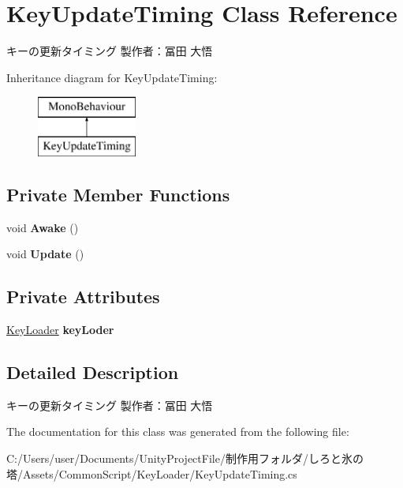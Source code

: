 \hypertarget{class_key_update_timing}{}\section{Key\+Update\+Timing Class Reference}
\label{class_key_update_timing}


キーの更新タイミング 製作者：冨田 大悟  


Inheritance diagram for Key\+Update\+Timing\+:\begin{figure}[H]
\begin{center}
\leavevmode
\includegraphics[height=2.000000cm]{class_key_update_timing}
\end{center}
\end{figure}
\subsection*{Private Member Functions}
\begin{DoxyCompactItemize}
\item 
\mbox{\label{class_key_update_timing_a2bd76d5f67f94cfebfd625121a2a562e}} 
void {\bfseries Awake} ()
\item 
\mbox{\label{class_key_update_timing_ac238dc3ea4a7f20b475e4168cf951e15}} 
void {\bfseries Update} ()
\end{DoxyCompactItemize}
\subsection*{Private Attributes}
\begin{DoxyCompactItemize}
\item 
\mbox{\label{class_key_update_timing_a670e725e80313518d1144a62f9f43487}} 
\hyperlink{class_key_loader}{Key\+Loader} {\bfseries key\+Loder}
\end{DoxyCompactItemize}


\subsection{Detailed Description}
キーの更新タイミング 製作者：冨田 大悟 



The documentation for this class was generated from the following file\+:\begin{DoxyCompactItemize}
\item 
C\+:/\+Users/user/\+Documents/\+Unity\+Project\+File/制作用フォルダ/しろと氷の塔/\+Assets/\+Common\+Script/\+Key\+Loader/Key\+Update\+Timing.\+cs\end{DoxyCompactItemize}
